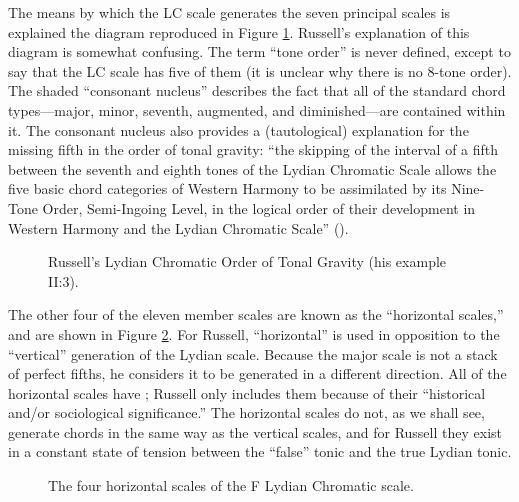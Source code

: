 The means by which the LC scale generates the seven principal scales is
explained the diagram reproduced in Figure
\ref{lcc:lc-tonal-gravity}. Russell's explanation of this diagram
is somewhat confusing. The term ``tone order'' is never defined, except to say
that the LC scale has five of them (it is unclear why there is no 8-tone
order). The shaded ``consonant nucleus'' describes the fact that all of the
standard chord types---major, minor, seventh, augmented, and diminished---are
contained within it. The consonant nucleus also provides a
(tautological) explanation for the missing fifth in the order of tonal
gravity: ``the skipping of the interval of a fifth between the seventh and
eighth tones of the Lydian Chromatic Scale allows the five basic chord
categories of Western Harmony to be assimilated by its Nine-Tone Order,
Semi-Ingoing Level, in the logical order of their development in Western
Harmony and the Lydian Chromatic Scale'' ().

\begin{figure}[tbp]
  \caption[Russell's Lydian Chromatic Order of Tonal Gravity.]{Russell's
    Lydian Chromatic Order of Tonal Gravity (his example II:3).}
  \label{lcc:lc-tonal-gravity}
\end{figure}

The other four of the eleven member scales are known as the ``horizontal
scales,'' and are shown in Figure \ref{lcc:horizontal-scales}. For Russell,
``horizontal'' is used in opposition to the ``vertical'' generation of the
Lydian scale. Because the major scale is not a stack of perfect fifths, he
considers it to be generated in a different direction. All of the horizontal
scales have \nat{}; Russell only includes them because of their ``historical
and/or sociological significance.'' The horizontal scales do not, as we shall
see, generate chords in the same way as the vertical scales, and for Russell
they exist in a constant state of tension between the ``false'' tonic and the
true Lydian tonic.

\begin{figure}[tbp]
  \caption{The four horizontal scales of the F Lydian Chromatic scale.}
  \label{lcc:horizontal-scales}
\end{figure}

